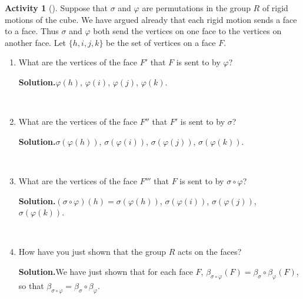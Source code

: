\documentclass[10pt,]{book}
\theoremstyle{plain}
\theoremstyle{definition}
\newtheorem{activity}[project]{Activity}
\numberwithin{equation}{chapter}
\begin{document}
\begin{activity}[]\label{activity-265}
Suppose that \(\sigma\) and \(\varphi\) are permutations in the group \(R\) of rigid motions of the cube. We have argued already that each rigid motion sends a face to a face. Thus \(\sigma\) and \(\varphi\) both send the vertices on one face to the vertices on another face. Let \(\{h,i,j,k\}\) be the set of vertices on a face \(F\).%
~\par
\begin{enumerate}[label=(\alph*)]
 \item What are the vertices of the face \(F'\) that \(F\) is sent to by \(\varphi\)?%
\par\medskip\noindent%
\textbf{Solution.}\quad \(\varphi(h)\), \(\varphi(i)\), \(\varphi(j)\), \(\varphi(k)\).%

~\par
\item What are the vertices of the face \(F''\) that \(F'\) is sent to by \(\sigma\)?%
\par\medskip\noindent%
\textbf{Solution.}\quad \(\sigma(\varphi(h))\), \(\sigma(\varphi(i))\), \(\sigma(\varphi(j))\), \(\sigma(\varphi(k))\).%

~\par
\item What are the vertices of the face \(F'''\) that \(F\) is sent to by \(\sigma\circ\varphi\)?%
\par\medskip\noindent%
\textbf{Solution.}\quad \((\sigma\circ\varphi)(h)=\sigma(\varphi(h))\), \(\sigma(\varphi(i))\), \(\sigma(\varphi(j))\), \(\sigma(\varphi(k))\).%

~\par
\item How have you just shown that the group \(R\) acts on the faces?%
\par\medskip\noindent%
\textbf{Solution.}\quad We have just shown that for each face \(F\), \(\beta_{\sigma\circ\varphi}(F) = \beta_{\sigma} \circ \beta_{\varphi}(F)\), so that \(\beta_{\sigma\circ\varphi} = \beta_{\sigma} \circ
\beta_{\varphi}\).%

\end{enumerate}
\end{activity}
\end{document}
